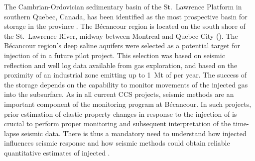 The Cambrian-Ordovician sedimentary basin of the St.\ Lawrence Platform in
southern Quebec, Canada, has been identified as the most prospective basin for
 storage in the province \citep{Malo2012}. The Bécancour region is
located on the south shore of the St.\ Lawrence River, midway between Montreal
and Quebec City (). The Bé\-can\-cour region's deep saline
aquifers were selected as a potential target for injection of  in a
future pilot project. This selection was based on seismic reflection and well
log data available from gas exploration, and based on the proximity of an
industrial zone emitting up to \SI{1}{\mega\tonne} of  per year. The
success of the storage depends on the capability to monitor movements of the
injected gas into the subsurface. As in all current CCS projects, seismic
methods are an important component of the monitoring program at Bécancour. In
such projects, prior estimation of elastic property changes in response to the
injection of  is crucial to perform proper monitoring and subsequent
interpretation of the time-lapse seismic data. There is thus a mandatory need to
understand how injected  influences seismic response and how seismic
methods could obtain reliable quantitative estimates of injected 
\citep{White2013}.\\

